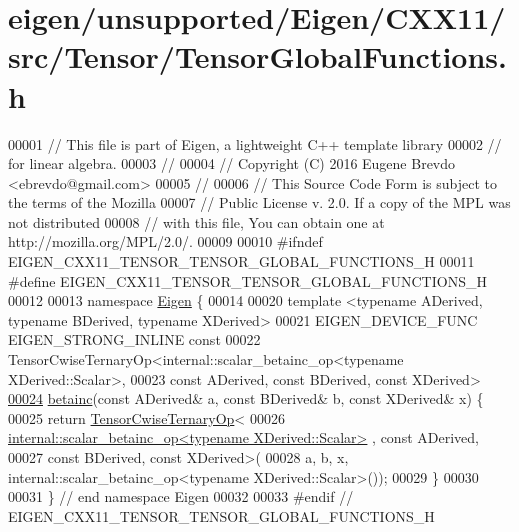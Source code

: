 \hypertarget{eigen_2unsupported_2_eigen_2_c_x_x11_2src_2_tensor_2_tensor_global_functions_8h_source}{}\section{eigen/unsupported/\+Eigen/\+C\+X\+X11/src/\+Tensor/\+Tensor\+Global\+Functions.h}
\label{eigen_2unsupported_2_eigen_2_c_x_x11_2src_2_tensor_2_tensor_global_functions_8h_source}

\begin{DoxyCode}
00001 \textcolor{comment}{// This file is part of Eigen, a lightweight C++ template library}
00002 \textcolor{comment}{// for linear algebra.}
00003 \textcolor{comment}{//}
00004 \textcolor{comment}{// Copyright (C) 2016 Eugene Brevdo <ebrevdo@gmail.com>}
00005 \textcolor{comment}{//}
00006 \textcolor{comment}{// This Source Code Form is subject to the terms of the Mozilla}
00007 \textcolor{comment}{// Public License v. 2.0. If a copy of the MPL was not distributed}
00008 \textcolor{comment}{// with this file, You can obtain one at http://mozilla.org/MPL/2.0/.}
00009 
00010 \textcolor{preprocessor}{#ifndef EIGEN\_CXX11\_TENSOR\_TENSOR\_GLOBAL\_FUNCTIONS\_H}
00011 \textcolor{preprocessor}{#define EIGEN\_CXX11\_TENSOR\_TENSOR\_GLOBAL\_FUNCTIONS\_H}
00012 
00013 \textcolor{keyword}{namespace }\hyperlink{namespace_eigen}{Eigen} \{
00014 
00020 \textcolor{keyword}{template} <\textcolor{keyword}{typename} ADerived, \textcolor{keyword}{typename} BDerived, \textcolor{keyword}{typename} XDerived>
00021 EIGEN\_DEVICE\_FUNC EIGEN\_STRONG\_INLINE \textcolor{keyword}{const}
00022     TensorCwiseTernaryOp<internal::scalar\_betainc\_op<typename XDerived::Scalar>,
00023                          \textcolor{keyword}{const} ADerived, \textcolor{keyword}{const} BDerived, \textcolor{keyword}{const} XDerived>
\hyperlink{namespace_eigen_a726eae91d4e91d8e25cbe55fffa6a92f}{00024}     \hyperlink{namespace_eigen_a726eae91d4e91d8e25cbe55fffa6a92f}{betainc}(\textcolor{keyword}{const} ADerived& a, \textcolor{keyword}{const} BDerived& b, \textcolor{keyword}{const} XDerived& x) \{
00025   \textcolor{keywordflow}{return} \hyperlink{class_eigen_1_1_tensor_cwise_ternary_op}{TensorCwiseTernaryOp}<
00026       \hyperlink{struct_eigen_1_1internal_1_1scalar__betainc__op}{internal::scalar\_betainc\_op<typename XDerived::Scalar>}
      , \textcolor{keyword}{const} ADerived,
00027       \textcolor{keyword}{const} BDerived, \textcolor{keyword}{const} XDerived>(
00028       a, b, x, internal::scalar\_betainc\_op<typename XDerived::Scalar>());
00029 \}
00030 
00031 \} \textcolor{comment}{// end namespace Eigen}
00032 
00033 \textcolor{preprocessor}{#endif // EIGEN\_CXX11\_TENSOR\_TENSOR\_GLOBAL\_FUNCTIONS\_H}
\end{DoxyCode}
